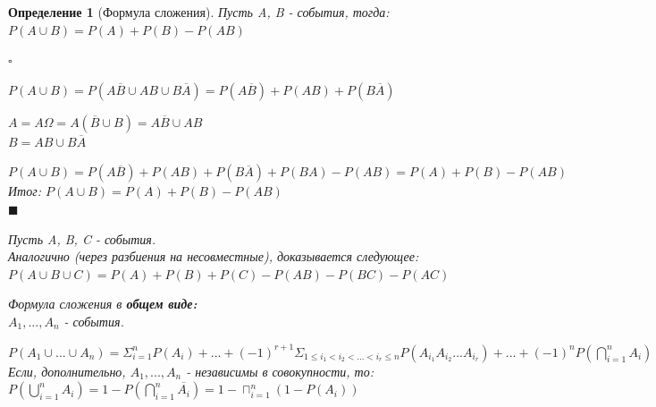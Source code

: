 \documentclass[14pt]{extarticle}
\theoremstyle{breakstyle}
\newtheorem{definition}{Определение}[subsection]
\begin{document}
\begin{definition}[Формула сложения]

Пусть A, B - события, тогда: \\
$P(A \cup B) = P(A) + P(B) - P(AB)$

$\square$

$P(A \cup B) = P(A \overline{B} \cup AB \cup B \overline{A}) = P(A \overline{B}) + P(AB) + P(B \overline{A})$ \\

\vspace{1em}

$A = A \Omega = A(\overline{B} \cup B) =  A \overline{B} \cup AB$ \\
$B = AB \cup B \overline{A}$ \\

\vspace{1em}

$P(A \cup B) = P(A \overline{B}) + P(AB) + P(B \overline{A}) + P(BA) - P(AB) = P(A) + P(B) - P(AB)$ \\
Итог: $P(A \cup B) = P(A) + P(B) - P(AB)$ \\

\hfill$\blacksquare$

Пусть A, B, C - события. \\
Аналогично (через разбиения на несовместные), доказывается следующее: \\
$P(A \cup B \cup C) = P(A) + P(B) + P(C) - P(AB) - P(BC) - P(AC)$ \\

\vspace{1em}

Формула сложения в \textbf{общем виде:}\\
$A_{1}, ... , A_{n}$ - события.

$P(A_{1} \cup ... \cup A_{n}) = \Sigma_{i=1}^{n}P(A_{i}) + ... + {(-1)}^{r+1}\Sigma_{1 \leq i_{1} < i_{2} < ... < i_{r} \leq n}P(A_{i_{1}}A_{i_{2}}...A_{i_{r}}) + ... + {(-1)}^{n}P(\bigcap_{i=1}^{n}A_{i})$ \\

\vspace{1em}
Если, дополнительно, $A_{1}, ... , A_{n}$ - независимы в совокупности, то: \\
$P(\bigcup_{i=1}^{n}A_{i}) = 1 - P(\bigcap_{i=1}^{n}\overline{A_{i}}) = 1 - \sqcap_{i=1}^{n}(1 - P(A_{i}))$

\end{definition}
\end{document}

